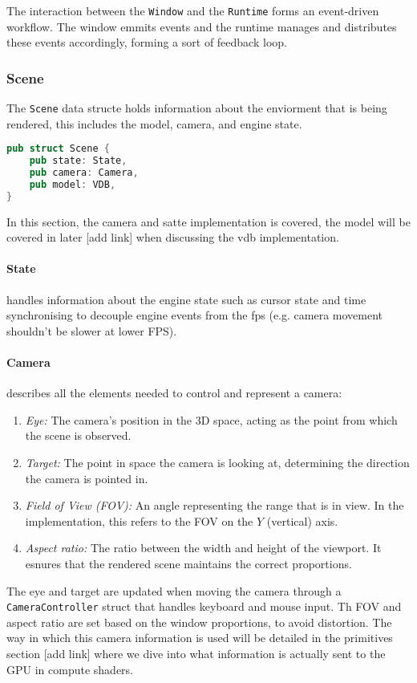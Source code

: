 The interaction between the \verb|Window| and the \verb|Runtime| forms an event-driven workflow. The window emmits events and the runtime manages and distributes these events accordingly, forming a sort of feedback loop.

\subsubsection{Scene}
The \verb|Scene| data structe holds information about the enviorment that is being rendered, this includes the model, camera, and engine state.

\begin{lstlisting}[language=rust,caption={Scene definition},captionpos=b]
pub struct Scene {
    pub state: State,
    pub camera: Camera,
    pub model: VDB,
}
\end{lstlisting}

In this section, the camera and satte implementation is covered, the model will be covered in later [add link] when discussing the \acrshort{vdb} implementation.

\paragraph{State} handles information about the engine state such as cursor state and time synchronising to decouple engine events from the \acrshort{fps} (e.g. camera movement shouldn't be slower at lower FPS).

\paragraph{Camera} describes all the elements needed to control and represent a camera:
\begin{enumerate}
    \item \emph{Eye:} The camera's position in the 3D space, acting as the point from which the scene is observed.
    \item \emph{Target:} The point in space the camera is looking at, determining the direction the camera is pointed in.
    \item \emph{Field of View (FOV):} An angle representing the range that is in view. In the implementation, this refers to the FOV on the $Y$ (vertical) axis.
    \item \emph{Aspect ratio:} The ratio between the width and height of the viewport. It esnures that the rendered scene maintains the correct proportions.
\end{enumerate}
The eye and target are updated when moving the camera through a \verb|CameraController| struct that handles keyboard and mouse input. Th FOV and aspect ratio are set based on the window proportions, to avoid distortion. The way in which this camera information is used will be detailed in the primitives section [add link] where we dive into what information is actually sent to the GPU in compute shaders.


